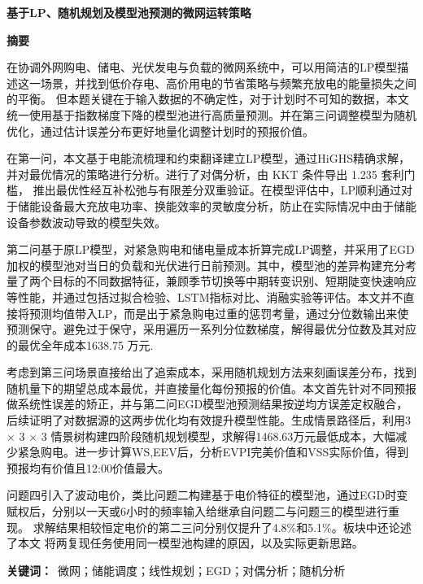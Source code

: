 \documentclass[zihao=-4,a4paper,fontset=none]{ctexart}
\begin{document}
\thispagestyle{empty}

\begin{center}
{\bfseries 基于LP、随机规划及模型池预测的微网运转策略}
\end{center}

\vspace{0.3em}
\centerline{\textbf{摘\quad 要}}
在协调外网购电、储电、光伏发电与负载的微网系统中，可以用简洁的LP模型描述这一场景，并找到低价存电、高价用电的节省策略与频繁充放电的能量损失之间的平衡。
但本题关键在于输入数据的不确定性，对于计划时不可知的数据，本文统一使用基于指数梯度下降的模型池进行高质量预测。并在第三问调整模型为随机优化，通过估计误差分布更好地量化调整计划时的预报价值。

在第一问，本文基于电能流梳理和约束翻译建立LP模型，通过HiGHS精确求解，
并对最优情况的策略进行分析。进行了对偶分析，由 KKT 条件导出 1.235 套利门槛，
推出最优性经互补松弛与有限差分双重验证。在模型评估中，LP顺利通过对于储能设备最大充放电功率、换能效率的灵敏度分析，防止在实际情况中由于储能设备参数波动导致的模型失效。

第二问基于原LP模型，对紧急购电和储电量成本折算完成LP调整，并采用了EGD加权的模型池对当日的负载和光伏进行日前预测。其中，模型池的差异构建充分考量了两个目标的不同数据特征，兼顾季节切换等中期转变识别、短期陡变快速响应等性能，并通过包括过拟合检验、LSTM指标对比、消融实验等评估。本文并不直接将预测均值带入LP，而是出于紧急购电过重的惩罚考量，通过分位数输出来使预测保守。避免过于保守，采用遍历一系列分位数梯度，解得最优分位数及其对应的最优全年成本1638.75 万元.

考虑到第三问场景直接给出了追索成本，采用随机规划方法来刻画误差分布，找到随机量下的期望总成本最优，并直接量化每份预报的价值。本文首先针对不同预报做系统性误差的矫正，并与第二问EGD模型池预测结果按逆均方误差定权融合，后续证明了对数据源的这两步优化均有效提升模型性能。生成情景路径后，利用3 × 3 × 3 情景树构建四阶段随机规划模型，求解得1468.63万元最低成本，大幅减少紧急购电。进一步计算WS,EEV后，分析EVPI完美价值和VSS实际价值，得到预报均有价值且12:00价值最大。

问题四引入了波动电价，类比问题二构建基于电价特征的模型池，通过EGD时变赋权后，分别以一天或6小时的频率输入给继承自问题二与问题三的模型进行重现。
求解结果相较恒定电价的第二三问分别仅提升了4.8\%和5.1\%。板块中还论述了本文
将两复现任务使用同一模型池构建的原因，以及实际更新思路。



\textbf{关键词：}\ 微网；储能调度；线性规划；EGD；对偶分析；随机分析
\end{document}
